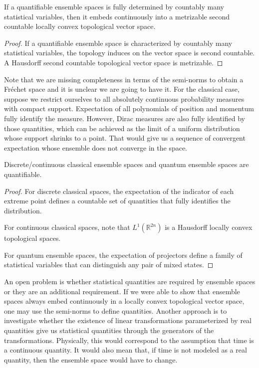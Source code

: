 \begin{prop}
	If a quantifiable ensemble spaces is fully determined by countably many statistical variables, then it embeds continuously into a metrizable second countable locally convex topological vector space.
\end{prop}

\begin{proof}
	If a quantifiable ensemble space is characterized by countably many statistical variables, the topology induces on the vector space is second countable. A Hausdorff second countable topological vector space is metrizable.
\end{proof}

\begin{remark}
	Note that we are missing completeness in terms of the semi-norms to obtain a Fr\'echet space and it is unclear we are going to have it. For the classical case, suppose we restrict ourselves to all absolutely continuous probability measures with compact support. Expectation of all polynomials of position and momentum fully identify the measure. However, Dirac measures are also fully identified by those quantities, which can be achieved as the limit of a uniform distribution whose support shrinks to a point. That would give us a sequence of convergent expectation whose ensemble does not converge in the space.
\end{remark}

\begin{prop}
	Discrete/continuous classical ensemble spaces and quantum ensemble spaces are quantifiable.
\end{prop}

\begin{proof}
	For discrete classical spaces, the expectation of the indicator of each extreme point defines a countable set of quantities that fully identifies the distribution.
	
	For continuous classical spaces, note that $L^1(\mathbb{R}^{2n})$ is a Hausdorff locally convex topological spaces.
	
	For quantum ensemble spaces, the expectation of projectors define a family of statistical variables that can distinguish any pair of mixed states.
\end{proof}

An open problem is whether statistical quantities are required by ensemble spaces or they are an additional requirement. If we were able to show that ensemble spaces always embed continuously in a locally convex topological vector space, one may use the semi-norms to define quantities. Another approach is to investigate whether the existence of linear transformations parameterized by real quantities give us statistical quantities through the generators of the transformations. Physically, this would correspond to the assumption that time is a continuous quantity. It would also mean that, if time is not modeled as a real quantity, then the ensemble space would have to change.

